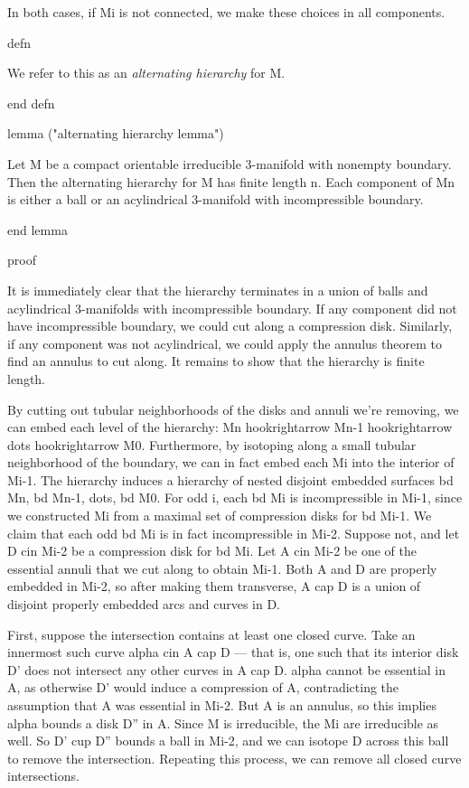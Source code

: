 In both cases, if Mi is not connected, we make these choices in all components.

defn

We refer to this as an \emph{alternating hierarchy} for M.

end defn

lemma ("alternating hierarchy lemma")

Let M be a compact orientable irreducible 3-manifold with nonempty boundary.
Then the alternating hierarchy for M has finite length n. Each component of Mn
is either a ball or an acylindrical 3-manifold with incompressible boundary.

end lemma

proof

It is immediately clear that the hierarchy terminates in a union of balls and
acylindrical 3-manifolds with incompressible boundary. If any component did not
have incompressible boundary, we could cut along a compression disk.
Similarly, if any component was not acylindrical, we could apply the annulus
theorem to find an annulus to cut along. It remains to show that the hierarchy
is finite length.

By cutting out tubular neighborhoods of the disks and annuli we're removing, we
can embed each level of the hierarchy: Mn hookrightarrow Mn-1 hookrightarrow
dots hookrightarrow M0. Furthermore, by isotoping along a small tubular
neighborhood of the boundary, we can in fact embed each Mi into the interior of
Mi-1. The hierarchy induces a hierarchy of nested disjoint embedded surfaces bd
Mn, bd Mn-1, dots, bd M0. For odd i, each bd Mi is incompressible in Mi-1,
since we constructed Mi from a maximal set of compression disks for bd Mi-1.
We claim that each odd bd Mi is in fact incompressible in Mi-2.  Suppose not,
and let D cin Mi-2 be a compression disk for bd Mi. Let A cin Mi-2 be one of
the essential annuli that we cut along to obtain Mi-1. Both A and D are
properly embedded in Mi-2, so after making them transverse, A cap D is a union
of disjoint properly embedded arcs and curves in D.

First, suppose the intersection contains at least one closed curve. Take an
innermost such curve alpha cin A cap D --- that is, one such that its interior
disk D' does not intersect any other curves in A cap D.  alpha cannot be
essential in A, as otherwise D' would induce a compression of A, contradicting
the assumption that A was essential in Mi-2.  But A is an annulus, so this
implies alpha bounds a disk D'' in A. Since M is irreducible, the Mi are
irreducible as well.  So D' cup D'' bounds a ball in Mi-2, and we can isotope
D across this ball to remove the intersection.  Repeating this process, we can
remove all closed curve intersections.

